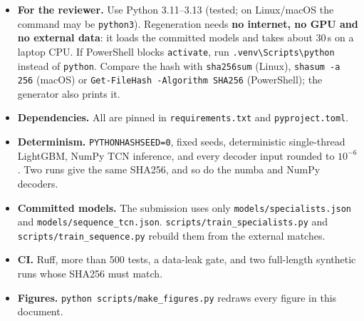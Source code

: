 \documentclass[10pt,a4paper]{article}
\newcommand{\code}[1]{\texttt{\small #1}}
\begin{document}
\begin{itemize}
\item \textbf{For the reviewer.} Use Python 3.11--3.13 (tested; on Linux/macOS the command may be \code{python3}). Regeneration needs \textbf{no internet, no GPU and no external data}: it loads the committed models and takes about 30\,s on a laptop CPU. If PowerShell blocks \code{activate}, run \code{.venv\textbackslash Scripts\textbackslash python} instead of \code{python}. Compare the hash with \code{sha256sum} (Linux), \code{shasum -a 256} (macOS) or \code{Get-FileHash -Algorithm SHA256} (PowerShell); the generator also prints it.
\item \textbf{Dependencies.} All are pinned in \code{requirements.txt} and \code{pyproject.toml}.
\item \textbf{Determinism.} \code{PYTHONHASHSEED=0}, fixed seeds, deterministic single-thread LightGBM, NumPy TCN inference, and every decoder input rounded to $10^{-6}$. Two runs give the same SHA256, and so do the numba and NumPy decoders.
\item \textbf{Committed models.} The submission uses only \code{models/specialists.json} and \code{models/sequence\_tcn.json}. \code{scripts/train\_specialists.py} and \code{scripts/train\_sequence.py} rebuild them from the external matches.
\item \textbf{CI.} Ruff, more than 500 tests, a data-leak gate, and two full-length synthetic runs whose SHA256 must match.
\item \textbf{Figures.} \code{python scripts/make\_figures.py} redraws every figure in this document.
\end{itemize}

\appendix
\end{document}
